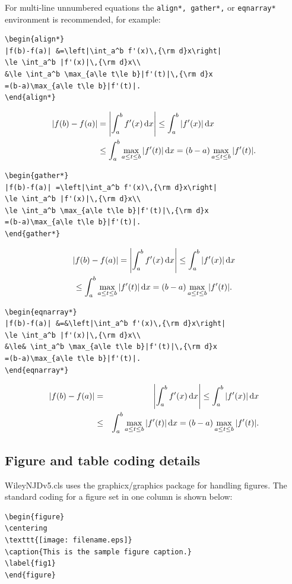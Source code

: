 \documentclass[11pt]{article}
\begin{document}
\noindent For multi-line unnumbered equations the \verb|align*, gather*,| or \verb|eqnarray*| environment is recommended, for example:
\begin{verbatim}
\begin{align*}
|f(b)-f(a)| &=\left|\int_a^b f'(x)\,{\rm d}x\right|
\le \int_a^b |f'(x)|\,{\rm d}x\\
&\le \int_a^b \max_{a\le t\le b}|f'(t)|\,{\rm d}x
=(b-a)\max_{a\le t\le b}|f'(t)|.
\end{align*}
\end{verbatim}
\begin{align*}
|f(b)-f(a)| &=\left|\int_a^b f'(x)\,{\rm d}x\right|
\le \int_a^b |f'(x)|\,{\rm d}x\\
&\le \int_a^b \max_{a\le t\le b}|f'(t)|\,{\rm d}x
=(b-a)\max_{a\le t\le b}|f'(t)|.
\end{align*}
\begin{verbatim}
\begin{gather*}
|f(b)-f(a)| =\left|\int_a^b f'(x)\,{\rm d}x\right|
\le \int_a^b |f'(x)|\,{\rm d}x\\
\le \int_a^b \max_{a\le t\le b}|f'(t)|\,{\rm d}x
=(b-a)\max_{a\le t\le b}|f'(t)|.
\end{gather*}
\end{verbatim}
\begin{gather*}
|f(b)-f(a)| =\left|\int_a^b f'(x)\,{\rm d}x\right|
\le \int_a^b |f'(x)|\,{\rm d}x\\
\le \int_a^b \max_{a\le t\le b}|f'(t)|\,{\rm d}x=(b-a)\max_{a\le t\le b}|f'(t)|.
\end{gather*}
\begin{verbatim}
\begin{eqnarray*}
|f(b)-f(a)| &=&\left|\int_a^b f'(x)\,{\rm d}x\right|
\le \int_a^b |f'(x)|\,{\rm d}x\\
&\le& \int_a^b \max_{a\le t\le b}|f'(t)|\,{\rm d}x
=(b-a)\max_{a\le t\le b}|f'(t)|.
\end{eqnarray*}
\end{verbatim}
\begin{eqnarray*}
|f(b)-f(a)| &=&\left|\int_a^b f'(x)\,{\rm d}x\right|
\le \int_a^b |f'(x)|\,{\rm d}x\\
&\le& \int_a^b \max_{a\le t\le b}|f'(t)|\,{\rm d}x=(b-a)\max_{a\le t\le b}|f'(t)|.
\end{eqnarray*}



\subsection{Figure and table coding details}
WileyNJDv5.cls uses the graphicx/graphics package for handling f{i}gures.  The standard coding for a f{i}gure set in one column is shown below:
\begin{verbatim}
\begin{figure}
\centering
\texttt{[image: filename.eps]}
\caption{This is the sample figure caption.}
\label{fig1}
\end{figure}
\end{verbatim}
\end{document}
